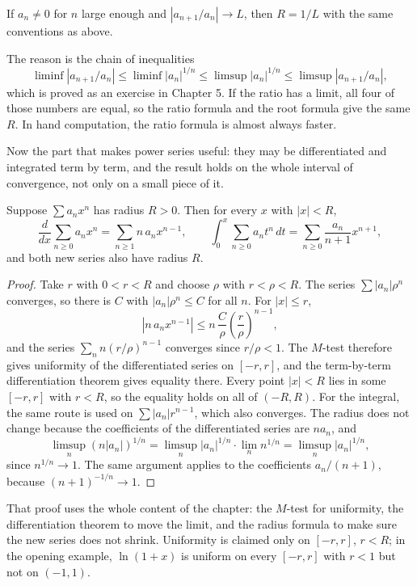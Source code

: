 \begin{akibat}
If $a_n\ne0$ for $n$ large enough and $|a_{n+1}/a_n|\to L$, then $R=1/L$
with the same conventions as above.
\end{akibat}

The reason is the chain of inequalities
\[
  \liminf|a_{n+1}/a_n|\le\liminf|a_n|^{1/n}\le\limsup|a_n|^{1/n}
  \le\limsup|a_{n+1}/a_n|,
\]
which is proved as an exercise in Chapter 5. If the ratio has a limit, all four of those
numbers are equal, so the ratio formula and the root formula give the same $R$. In
hand computation, the ratio formula is almost always faster.

Now the part that makes power series useful: they may be differentiated and
integrated term by term, and the result holds on the whole interval of
convergence, not only on a small piece of it.

\begin{teorema}
Suppose $\sum a_nx^n$ has radius $R>0$. Then for every $x$ with
$|x|<R$,
\[
  \frac{d}{dx}\sum_{n\ge0}a_nx^n=\sum_{n\ge1}n\,a_nx^{n-1},
  \qquad
  \int_0^x\sum_{n\ge0}a_nt^n\,dt=\sum_{n\ge0}\frac{a_n}{n+1}x^{n+1},
\]
and both new series also have radius $R$.
\end{teorema}

\begin{proof}
Take $r$ with $0<r<R$ and choose $\rho$ with $r<\rho<R$. The series
$\sum|a_n|\rho^n$ converges, so there is $C$ with $|a_n|\rho^n\le C$ for all
$n$. For $|x|\le r$,
\[
  |n\,a_nx^{n-1}|\le n\,\frac{C}{\rho}\left(\frac{r}{\rho}\right)^{n-1},
\]
and the series $\sum_n n(r/\rho)^{n-1}$ converges since $r/\rho<1$. The $M$-test
therefore gives uniformity of the differentiated series on $[-r,r]$, and the term-by-term
differentiation theorem gives equality there. Every point $|x|<R$ lies in some
$[-r,r]$ with $r<R$, so the equality holds on all of $(-R,R)$. For the
integral, the same route is used on $\sum|a_n|r^{n-1}$, which also converges.
The radius does not change because the coefficients of the differentiated series are $na_n$, and
\[
  \limsup_n(n|a_n|)^{1/n}
  =\limsup_n|a_n|^{1/n}\cdot\lim_n n^{1/n}
  =\limsup_n|a_n|^{1/n},
\]
since $n^{1/n}\to1$. The same argument applies to the coefficients $a_n/(n+1)$,
because $(n+1)^{-1/n}\to1$.
\end{proof}

That proof uses the whole content of the chapter: the $M$-test for uniformity, the differentiation
theorem to move the limit, and the radius formula to make sure the new series does not
shrink. Uniformity is claimed only on $[-r,r]$, $r<R$; in the opening example,
$\ln(1+x)$ is uniform on every $[-r,r]$ with $r<1$ but not on $(-1,1)$.

